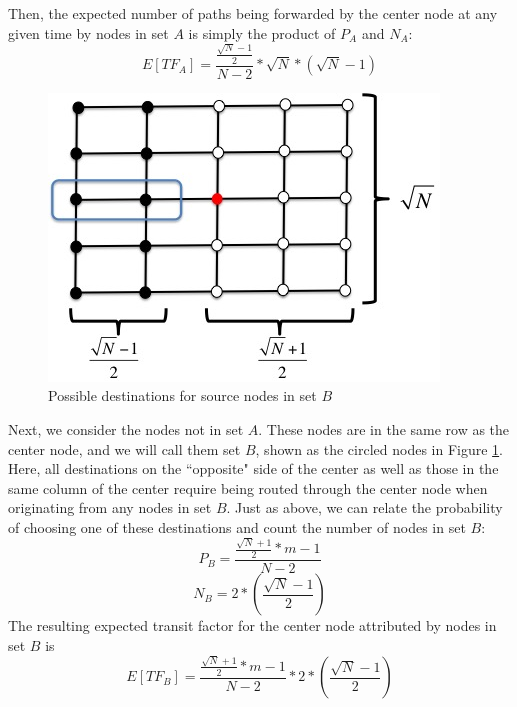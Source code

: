 Then, the expected number of paths being forwarded by the center node at any given time by nodes in set $A$ is simply the product of $P_A$ and $N_A$:
\begin{equation}
	E[TF_{A}] = \frac{\frac{\sqrt{N}-1}{2}}{N-2} * \sqrt{N}*(\sqrt{N}-1)
\end{equation}

\begin{figure}
\begin{centering}
    \includegraphics[scale=0.50]{figures/TF_proof_fig_2.jpg}
    \caption{Possible destinations for source nodes in set $B$}
    \label{fig:TF_proof_fig_2}
\end{centering}
\end{figure}

Next, we consider the nodes not in set $A$.  These nodes are in the same row as the center node, and we will call them set $B$, shown as the circled nodes in Figure \ref{fig:TF_proof_fig_2}.  Here, all destinations on the ``opposite" side of the center as well as those in the same column of the center require being routed through the center node when originating from any nodes in set $B$.  Just as above, we can relate the probability of choosing one of these destinations and count the number of nodes in set $B$:
\begin{equation}
	P_{B} = \frac{\frac{\sqrt{N}+1}{2}*m - 1}{N-2}
\end{equation}
\begin{equation}
	N_{B} = 2*(\frac{\sqrt{N}-1}{2})
\end{equation}
The resulting expected transit factor for the center node attributed by nodes in set $B$ is
\begin{equation}
	E[TF_{B}] = \frac{\frac{\sqrt{N}+1}{2}*m - 1}{N-2}*2*(\frac{\sqrt{N}-1}{2})
\end{equation}

